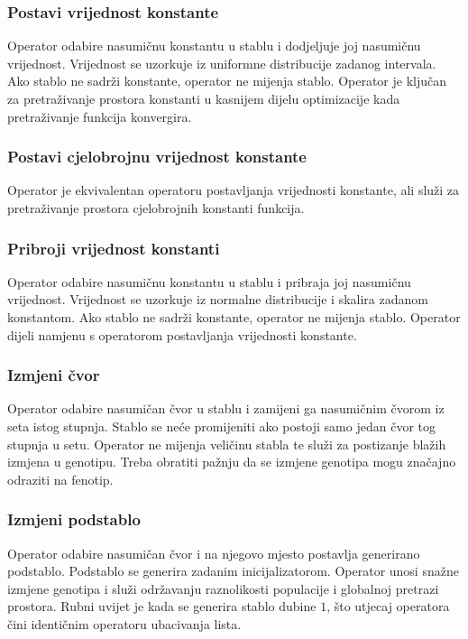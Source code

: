 \documentclass[times, utf8, numeric, diplomski]{fer}
\begin{document}
\subsubsection{Postavi vrijednost konstante}
Operator odabire nasumičnu konstantu u stablu i dodjeljuje joj nasumičnu vrijednost. Vrijednost se uzorkuje iz uniformne distribucije zadanog intervala. Ako stablo ne sadrži konstante, operator ne mijenja stablo. Operator je ključan za pretraživanje prostora konstanti u kasnijem dijelu optimizacije kada pretraživanje funkcija konvergira.

\subsubsection{Postavi cjelobrojnu vrijednost konstante}
Operator je ekvivalentan operatoru postavljanja vrijednosti konstante, ali služi za pretraživanje prostora cjelobrojnih konstanti funkcija.

\subsubsection{Pribroji vrijednost konstanti}
Operator odabire nasumičnu konstantu u stablu i pribraja joj nasumičnu vrijednost. Vrijednost se uzorkuje iz normalne distribucije i skalira zadanom konstantom. Ako stablo ne sadrži konstante, operator ne mijenja stablo. Operator dijeli namjenu s operatorom postavljanja vrijednosti konstante.

\subsubsection{Izmjeni čvor}
Operator odabire nasumičan čvor u stablu i zamijeni ga nasumičnim čvorom iz seta istog stupnja. Stablo se neće promijeniti ako postoji samo jedan čvor tog stupnja u setu. Operator ne mijenja veličinu stabla te služi za postizanje blažih izmjena u genotipu. Treba obratiti pažnju da se izmjene genotipa mogu značajno odraziti na fenotip.

\subsubsection{Izmjeni podstablo}
Operator odabire nasumičan čvor i na njegovo mjesto postavlja generirano podstablo. Podstablo se generira zadanim inicijalizatorom. Operator unosi snažne izmjene genotipa i služi održavanju raznolikosti populacije i globalnoj pretrazi prostora. Rubni uvijet je kada se generira stablo dubine $1$, što utjecaj operatora čini identičnim operatoru ubacivanja lista.
\end{document}
